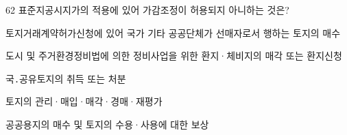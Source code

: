 \begin{question}{62}
표준지공시지가의 적용에 있어 가감조정이 허용되지 아니하는 것은?
\begin{choices}
  \item 토지거래계약허가신청에 있어 국가 기타 공공단체가 선매자로서 행하는 토지의 매수
  \item 도시 및 주거환경정비법에 의한 정비사업을 위한 환지·체비지의 매각 또는 환지신청
  \item 국․공유토지의 취득 또는 처분
  \item 토지의 관리·매입·매각·경매·재평가
  \item 공공용지의 매수 및 토지의 수용·사용에 대한 보상
\end{choices}
\end{question}
